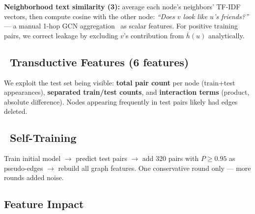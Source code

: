\documentclass[10pt,a4paper,twocolumn]{article}
\begin{document}
\textbf{Neighborhood text similarity (3):} average each node's neighbors' TF-IDF vectors, then compute cosine with the other node: \emph{``Does $v$ look like $u$'s friends?''} — a manual 1-hop GCN aggregation~\cite{zhou2004} as scalar features. For positive training pairs, we correct leakage by excluding $v$'s contribution from $\bar{h}(u)$ analytically.

\subsection{~Transductive Features (6 features)}

We exploit the test set being visible: \textbf{total pair count} per node (train+test appearances), \textbf{separated train/test counts}, and \textbf{interaction terms} (product, absolute difference). Nodes appearing frequently in test pairs likely had edges deleted.

\subsection{~Self-Training}

Train initial model $\to$ predict test pairs $\to$ add 320 pairs with $P\geq0.95$ as pseudo-edges $\to$ rebuild all graph features. One conservative round only — more rounds added noise.

\subsection{Feature Impact}
\end{document}
